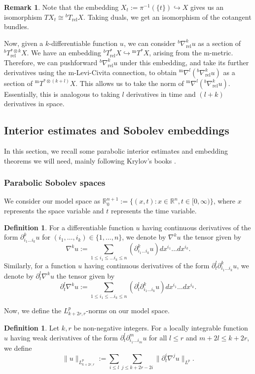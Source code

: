 \documentclass[10pt, a4paper]{article}
\theoremstyle{plain}%
\theoremstyle{definition}
\newtheorem{defn}[theorem]{Definition}
\newtheorem{rem}[theorem]{Remark}
\numberwithin{figure}{section}
\numberwithin{equation}{section}
\newcommand{\bR}{\mathbb{R}}
\newcommand{\pa}{\partial}
\newcommand{\m}{\mathrm{m}}
\begin{document}
\begin{rem}
	Note that the embedding $X_t:=\pi^{-1}(\{t\})\hookrightarrow X$ gives us an isomorphism $TX_t \cong {^bT_\mathrm{rel}X}.$ Taking duals, we get an isomorphism of the cotangent bundles. 
\end{rem}
Now, given a $k$-differentiable function $u$, we can consider $^b\nabla^k_\mathrm{rel}u$ as a section of $^bT^{*\otimes k}_\mathrm{rel}X$. We have an embedding $^bT^*_\mathrm{rel}X\hookrightarrow {^{\m}T}^*X$, arising from the m-metric. Therefore, we can pushforward $^b\nabla^k_\mathrm{rel}u$ under this embedding, and take its further derivatives using the m-Levi-Civita connection, to obtain $^{\m}\nabla^l({^b\nabla_{\mathrm{rel}}^k}u)$ as a section of $^{\m}T^{*\otimes (k+l)}X$. This allows us to take the norm of $^{\m}\nabla^l({^b\nabla_{\mathrm{rel}}^k}u)$. Essentially, this is analogous to taking $l$ derivatives in time and $(l+k)$ derivatives in space.


\subsection{Interior estimates and Sobolev embeddings}
In this section, we recall some parabolic interior estimates and embedding theorems we will need, mainly following Krylov's books \cite{Kry08,Kry96}. 
\subsubsection{Parabolic Sobolev spaces}
We consider our model space as $\bR^{n+1}_0:=\{(x,t):x\in\bR^{n}, t\in [0,\infty)\}$, where $x$ represents the space variable and $t$ represents the time variable. 
\begin{defn}
	For a differentiable function $u$ having continuous derivatives of the form $\pa^k_{{i_1\dots i_k}}u$ for $(i_1,\dots, i_k)\in \{1,\dots, n\}$, we denote by $\nabla^ku$ the tensor given by \[
	\nabla^ku:= \sum_{1\leq i_1\leq \dots i_k\leq n} (\pa^k_{i_1\dots i_k}u)dx^{i_1}\dots dx^{i_k}.\]
	Similarly, for a function $u$ having continuous derivatives of the form $\pa_t^l\pa^k_{i_1\dots i_k}u$, we denote by $\pa_t^l\nabla^ku$ the tensor given by \[
	\pa_t^l\nabla^ku:=\sum_{1\leq i_1\leq \dots i_k\leq n} (\pa_t^l\pa^k_{i_1\dots i_k}u)dx^{i_1}\dots dx^{i_k}.
	\]
\end{defn}
Now, we define the $L^p_{k+2r,r}$-norms on our model space.
\begin{defn}
	Let $k,r$ be non-negative integers. For a locally integrable function $u$ having weak derivatives of the form $\pa_t^l\pa^m_{i_1\dots i_m}u$ for all $l\leq r$ and $m+2l\leq k+2r$, we define \[
	\|u\|_{L^p_{k+2r,r}}:= \sum_{i\leq l}\sum_{j\leq k+2r-2i}\|\pa_t^i\nabla^ju\|_{L^p}.
	\]
\end{defn}
\end{document}
